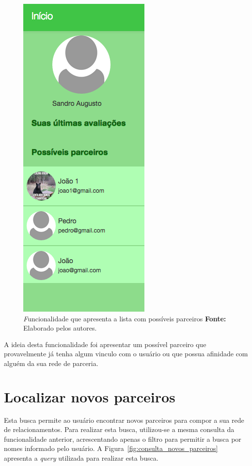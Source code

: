 \begin{figure}[h!]
	\centerline{\includegraphics[scale=0.4]{./imagens/busca-possiveis-parceiros.png}}
	\caption[\textit Funcionalidade que apresenta a lista com possíveis parceiros]
	{\textit Funcionalidade que apresenta a lista com possíveis parceiros \textbf{Fonte:} Elaborado pelos autores.}
	\label{fig:busca_possiveis_parceiros}
\end{figure}

\par A ideia desta funcionalidade foi apresentar um possível parceiro que provavelmente já tenha algum vinculo com o usuário ou que possua afinidade com alguém da sua rede de parceria.

\section{Localizar novos parceiros}
\par Esta busca permite ao usuário encontrar novos parceiros para compor a sua rede de relacionamentos. Para realizar esta busca, utilizou-se a mesma consulta da funcionalidade anterior, acrescentando apenas o filtro para permitir a busca por nomes informado pelo usuário. A Figura~\ref{fig:consulta_novos_parceiros} apresenta a \textit{query} utilizada para realizar esta busca.

